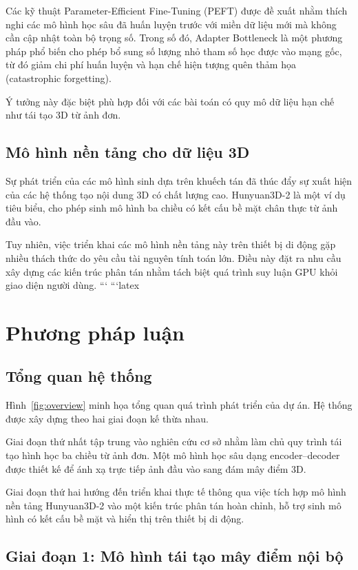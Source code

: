 \documentclass[conference,a4paper]{IEEEtran}
\begin{document}
Các kỹ thuật Parameter-Efficient Fine-Tuning (PEFT) được đề xuất nhằm thích nghi các mô hình học sâu đã huấn luyện trước với miền dữ liệu mới mà không cần cập nhật toàn bộ trọng số. Trong số đó, Adapter Bottleneck là một phương pháp phổ biến cho phép bổ sung số lượng nhỏ tham số học được vào mạng gốc, từ đó giảm chi phí huấn luyện và hạn chế hiện tượng quên thảm họa (catastrophic forgetting).

Ý tưởng này đặc biệt phù hợp đối với các bài toán có quy mô dữ liệu hạn chế như tái tạo 3D từ ảnh đơn.

\subsection{Mô hình nền tảng cho dữ liệu 3D}

Sự phát triển của các mô hình sinh dựa trên khuếch tán đã thúc đẩy sự xuất hiện của các hệ thống tạo nội dung 3D có chất lượng cao. Hunyuan3D-2 \cite{hunyuan} là một ví dụ tiêu biểu, cho phép sinh mô hình ba chiều có kết cấu bề mặt chân thực từ ảnh đầu vào.

Tuy nhiên, việc triển khai các mô hình nền tảng này trên thiết bị di động gặp nhiều thách thức do yêu cầu tài nguyên tính toán lớn. Điều này đặt ra nhu cầu xây dựng các kiến trúc phân tán nhằm tách biệt quá trình suy luận GPU khỏi giao diện người dùng.
```
```latex
\section{Phương pháp luận}

\subsection{Tổng quan hệ thống}

Hình~\ref{fig:overview} minh họa tổng quan quá trình phát triển của dự án. Hệ thống được xây dựng theo hai giai đoạn kế thừa nhau.

Giai đoạn thứ nhất tập trung vào nghiên cứu cơ sở nhằm làm chủ quy trình tái tạo hình học ba chiều từ ảnh đơn. Một mô hình học sâu dạng encoder--decoder được thiết kế để ánh xạ trực tiếp ảnh đầu vào sang đám mây điểm 3D.

Giai đoạn thứ hai hướng đến triển khai thực tế thông qua việc tích hợp mô hình nền tảng Hunyuan3D-2 vào một kiến trúc phân tán hoàn chỉnh, hỗ trợ sinh mô hình có kết cấu bề mặt và hiển thị trên thiết bị di động.

\subsection{Giai đoạn 1: Mô hình tái tạo mây điểm nội bộ}
\end{document}
